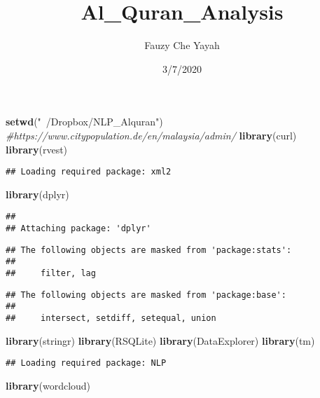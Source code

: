 \documentclass[]{article}
\title{Al\_Quran\_Analysis}
\author{Fauzy Che Yayah}
\date{3/7/2020}
\newenvironment{Shaded}{\begin{snugshade}}{\end{snugshade}}
\newcommand{\CommentTok}[1]{\textcolor[rgb]{0.56,0.35,0.01}{\textit{#1}}}
\newcommand{\KeywordTok}[1]{\textcolor[rgb]{0.13,0.29,0.53}{\textbf{#1}}}
\newcommand{\NormalTok}[1]{#1}
\newcommand{\StringTok}[1]{\textcolor[rgb]{0.31,0.60,0.02}{#1}}
\begin{document}
\maketitle

\begin{Shaded}
\begin{Highlighting}[]
\KeywordTok{setwd}\NormalTok{(}\StringTok{"~/Dropbox/NLP_Alquran"}\NormalTok{)}
\CommentTok{#https://www.citypopulation.de/en/malaysia/admin/}
\KeywordTok{library}\NormalTok{(curl)}
\KeywordTok{library}\NormalTok{(rvest)}
\end{Highlighting}
\end{Shaded}

\begin{verbatim}
## Loading required package: xml2
\end{verbatim}

\begin{Shaded}
\begin{Highlighting}[]
\KeywordTok{library}\NormalTok{(dplyr)}
\end{Highlighting}
\end{Shaded}

\begin{verbatim}
## 
## Attaching package: 'dplyr'
\end{verbatim}

\begin{verbatim}
## The following objects are masked from 'package:stats':
## 
##     filter, lag
\end{verbatim}

\begin{verbatim}
## The following objects are masked from 'package:base':
## 
##     intersect, setdiff, setequal, union
\end{verbatim}

\begin{Shaded}
\begin{Highlighting}[]
\KeywordTok{library}\NormalTok{(stringr)}
\KeywordTok{library}\NormalTok{(RSQLite)}
\KeywordTok{library}\NormalTok{(DataExplorer)}
\KeywordTok{library}\NormalTok{(tm)}
\end{Highlighting}
\end{Shaded}

\begin{verbatim}
## Loading required package: NLP
\end{verbatim}

\begin{Shaded}
\begin{Highlighting}[]
\KeywordTok{library}\NormalTok{(wordcloud)}
\end{Highlighting}
\end{Shaded}
\end{document}
